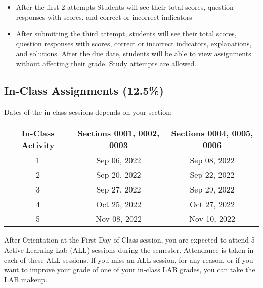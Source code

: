 \documentclass[11pt]{paper}
\begin{document}
\begin{itemize}
\item After the first 2 attempts Students will see their total scores, question responses with scores, and correct or incorrect indicators
\item After submitting the third attempt, students will see their total scores, question responses with scores, correct or incorrect indicators, explanations, and solutions. After the due date, students will be able to view assignments without affecting their grade. Study attempts are allowed.
\end{itemize}

\subsection{In-Class Assignments (12.5\%)}

Dates of the in-class sessions depends on your section:\\

\begin{flushleft}
\begin{tabular}{ c  c  c }\hline
 In-Class Activity & Sections 0001, 0002, 0003 & Sections 0004, 0005, 0006 \\\hline
 1 & Sep 06, 2022 & Sep 08, 2022 \\
 2 & Sep 20, 2022 & Sep 22, 2022\\
 3 & Sep 27, 2022 & Sep 29, 2022\\
 4 & Oct 25, 2022 & Oct 27, 2022\\
 5 & Nov 08, 2022 & Nov 10, 2022 \\\hline
\end{tabular}
\end{flushleft}

After Orientation at the First Day of Class session, you are expected to attend 5 Active Learning Lab (ALL) sessions during the semester. Attendance is taken in each of these ALL sessions. If you miss an ALL session, for any reason, or if you want to improve your grade of one of your in-class LAB grades, you can take the LAB makeup.
\end{document}
